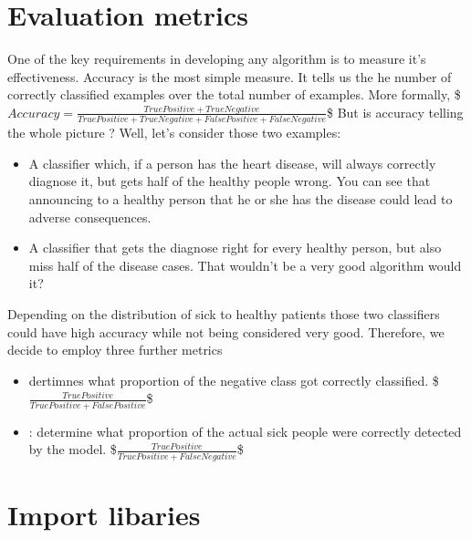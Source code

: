 \documentclass[letterpaper,10pt,english]{jupyterBook}
\begin{document}
\section{Evaluation metrics}
\label{\detokenize{Model_evaluation:evaluation-metrics}}
\sphinxAtStartPar
One of the key requirements in developing any algorithm is to measure it’s effectiveness. Accuracy is the most simple measure. It tells us the he number of correctly classified examples over the total number of examples. More formally,
\$\(
 Accuracy = \frac{TruePositive + TrueNegative}{TruePositive + TrueNegative + FalsePositive + FalseNegative  }
\)\$
But is accuracy telling the whole picture ?
Well, let’s consider those two examples:
\begin{itemize}
\item {} 
\sphinxAtStartPar
A classifier which, if a person has the heart disease, will always correctly diagnose it, but gets half of the healthy people wrong. You can see that announcing to a healthy person that he or she has the disease could lead to adverse consequences.

\item {} 
\sphinxAtStartPar
A classifier that gets the diagnose right for every healthy person, but also miss half of the disease cases. That wouldn’t be a very good algorithm would it?

\end{itemize}

\sphinxAtStartPar
Depending on the distribution of sick to healthy patients those two classifiers could have high accuracy while not being considered very good. Therefore, we decide to employ three further metrics
\begin{itemize}
\item {} 
\sphinxAtStartPar
{} dertimnes what proportion of the negative class got correctly classified.
\$\(
\frac{TruePositive}{TruePositive +   FalsePositive    }
\)\$

\item {} 
\sphinxAtStartPar
{}: determine what proportion of the actual sick people were correctly detected by the model.
\$\(
\frac{TruePositive}{TruePositive +    FalseNegative   }
\)\$

\end{itemize}


\section{Import libaries}
\label{\detokenize{Model_evaluation:import-libaries}}
\end{document}
